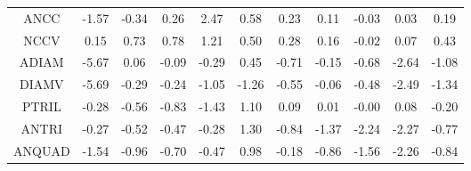 \begin{longtable}{ | c || c | c | c | c | c | c | c | c | c || c |}
ANCC &  \cellcolor[HTML]{FFD7D7} -1.57 &  \cellcolor[HTML]{FFF7F7} -0.34 &  \cellcolor[HTML]{F7F7FF} 0.26 &  \cellcolor[HTML]{BFBFFF} 2.47 &  \cellcolor[HTML]{EFEFFF} 0.58 &  \cellcolor[HTML]{F7F7FF} 0.23 &  \cellcolor[HTML]{FFFFFF} 0.11 &  \cellcolor[HTML]{FFFFFF} -0.03 &  \cellcolor[HTML]{FFFFFF} 0.03 &  \cellcolor[HTML]{F7F7FF} 0.19 \\
NCCV &  \cellcolor[HTML]{FFFFFF} 0.15 &  \cellcolor[HTML]{EFEFFF} 0.73 &  \cellcolor[HTML]{EFEFFF} 0.78 &  \cellcolor[HTML]{DFDFFF} 1.21 &  \cellcolor[HTML]{EFEFFF} 0.50 &  \cellcolor[HTML]{F7F7FF} 0.28 &  \cellcolor[HTML]{F7F7FF} 0.16 &  \cellcolor[HTML]{FFFFFF} -0.02 &  \cellcolor[HTML]{FFFFFF} 0.07 &  \cellcolor[HTML]{F7F7FF} 0.43 \\
ADIAM &  \cellcolor[HTML]{FF7070} -5.67 &  \cellcolor[HTML]{FFFFFF} 0.06 &  \cellcolor[HTML]{FFFFFF} -0.09 &  \cellcolor[HTML]{FFF7F7} -0.29 &  \cellcolor[HTML]{F7F7FF} 0.45 &  \cellcolor[HTML]{FFEFEF} -0.71 &  \cellcolor[HTML]{FFFFFF} -0.15 &  \cellcolor[HTML]{FFEFEF} -0.68 &  \cellcolor[HTML]{FFBFBF} -2.64 &  \cellcolor[HTML]{FFE7E7} -1.08 \\
DIAMV &  \cellcolor[HTML]{FF7070} -5.69 &  \cellcolor[HTML]{FFF7F7} -0.29 &  \cellcolor[HTML]{FFF7F7} -0.24 &  \cellcolor[HTML]{FFE7E7} -1.05 &  \cellcolor[HTML]{FFDFDF} -1.26 &  \cellcolor[HTML]{FFEFEF} -0.55 &  \cellcolor[HTML]{FFFFFF} -0.06 &  \cellcolor[HTML]{FFF7F7} -0.48 &  \cellcolor[HTML]{FFBFBF} -2.49 &  \cellcolor[HTML]{FFDFDF} -1.34 \\
PTRIL &  \cellcolor[HTML]{FFF7F7} -0.28 &  \cellcolor[HTML]{FFEFEF} -0.56 &  \cellcolor[HTML]{FFE7E7} -0.83 &  \cellcolor[HTML]{FFD7D7} -1.43 &  \cellcolor[HTML]{E7E7FF} 1.10 &  \cellcolor[HTML]{FFFFFF} 0.09 &  \cellcolor[HTML]{FFFFFF} 0.01 &  \cellcolor[HTML]{FFFFFF} -0.00 &  \cellcolor[HTML]{FFFFFF} 0.08 &  \cellcolor[HTML]{FFF7F7} -0.20 \\
ANTRI &  \cellcolor[HTML]{FFF7F7} -0.27 &  \cellcolor[HTML]{FFEFEF} -0.52 &  \cellcolor[HTML]{FFF7F7} -0.47 &  \cellcolor[HTML]{FFF7F7} -0.28 &  \cellcolor[HTML]{DFDFFF} 1.30 &  \cellcolor[HTML]{FFE7E7} -0.84 &  \cellcolor[HTML]{FFDFDF} -1.37 &  \cellcolor[HTML]{FFC7C7} -2.24 &  \cellcolor[HTML]{FFC7C7} -2.27 &  \cellcolor[HTML]{FFEFEF} -0.77 \\
ANQUAD &  \cellcolor[HTML]{FFD7D7} -1.54 &  \cellcolor[HTML]{FFE7E7} -0.96 &  \cellcolor[HTML]{FFEFEF} -0.70 &  \cellcolor[HTML]{FFF7F7} -0.47 &  \cellcolor[HTML]{E7E7FF} 0.98 &  \cellcolor[HTML]{FFF7F7} -0.18 &  \cellcolor[HTML]{FFE7E7} -0.86 &  \cellcolor[HTML]{FFD7D7} -1.56 &  \cellcolor[HTML]{FFC7C7} -2.26 &  \cellcolor[HTML]{FFE7E7} -0.84 \\

\end{longtable}
